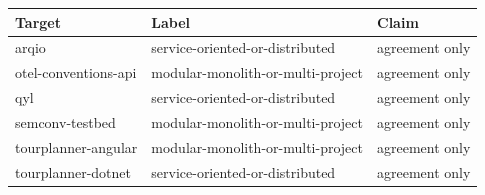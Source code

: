 \begin{tabular}{lll}
\hline
Target & Label & Claim \\
\hline
arqio & service-oriented-or-distributed & agreement only \\
otel-conventions-api & modular-monolith-or-multi-project & agreement only \\
qyl & service-oriented-or-distributed & agreement only \\
semconv-testbed & modular-monolith-or-multi-project & agreement only \\
tourplanner-angular & modular-monolith-or-multi-project & agreement only \\
tourplanner-dotnet & service-oriented-or-distributed & agreement only \\
\hline
\end{tabular}

